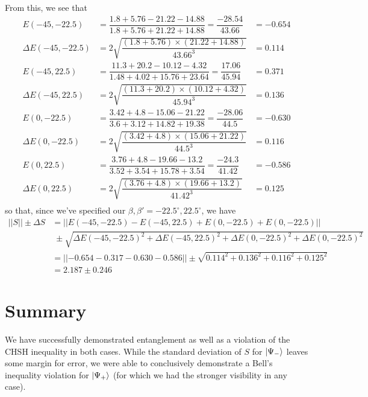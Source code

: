 \documentclass[10pt,a4paper]{article}
\begin{document}
\noindent From this, we see that 
\begin{align*}
E(-45, -22.5) &= \dfrac{1.8 + 5.76 - 21.22 - 14.88}{1.8 + 5.76 + 21.22 + 14.88} = \dfrac{-28.54}{43.66} &= -0.654\\
\Delta E(-45, -22.5) &= 2\sqrt{\dfrac{(1.8 + 5.76)\times(21.22 + 14.88)}{43.66^{3}}} &= 0.114\\
E(-45, 22.5) &= \dfrac{11.3 + 20.2 - 10.12 - 4.32}{1.48 + 4.02 + 15.76 + 23.64} = \dfrac{17.06}{45.94} &= 0.371\\
\Delta E(-45, 22.5) &= 2\sqrt{\dfrac{(11.3 + 20.2)\times(10.12 + 4.32)}{45.94^{3}}} &= 0.136\\
E(0,-22.5) &= \dfrac{3.42 + 4.8 - 15.06 - 21.22}{3.6 + 3.12 + 14.82 + 19.38} = \dfrac{-28.06}{44.5} &= -0.630\\
\Delta E(0, -22.5) &= 2\sqrt{\dfrac{(3.42 + 4.8)\times(15.06 + 21.22)}{44.5^{3}}} &= 0.116\\
E(0,22.5) &= \dfrac{3.76 + 4.8 - 19.66 - 13.2}{3.52 + 3.54 + 15.78 + 3.54} = \dfrac{-24.3}{41.42} &= -0.586\\
\Delta E(0,22.5) &= 2\sqrt{\dfrac{(3.76 + 4.8)\times(19.66 + 13.2)}{41.42^{3}}} &= 0.125\\
\end{align*}
\noindent so that, since we've specified our $\beta,\beta' = -22.5^{\circ}, 22.5^{\circ}$, we have
\begin{align*}
\lvert| S \rvert| \pm \Delta S &= \lvert|E(-45, -22.5) - E(-45, 22.5) + E(0,-22.5) + E(0,-22.5)\rvert|\\
&\;\pm \sqrt{\Delta E(-45, -22.5)^{2} + \Delta E(-45, 22.5)^{2} + \Delta E(0,-22.5)^{2} + \Delta E(0,-22.5)^{2}}\\
&= \lvert|- 0.654 - 0.317 - 0.630 - 0.586 \rvert| \pm \sqrt{0.114^{2} + 0.136^{2} + 0.116^{2} + 0.125^{2}}\\
&= 2.187 \pm 0.246
\end{align*}
\section*{Summary}
We have successfully demonstrated entanglement as well as a violation of the CHSH inequality in both cases. While the standard deviation of $S$ for $\ket{\Psi_{-}}$ leaves some margin for error,  we were able to conclusively demonstrate a Bell's inequality violation for $\ket{\Psi_{+}}$ (for which we had the stronger visibility in any case).
\end{document}
